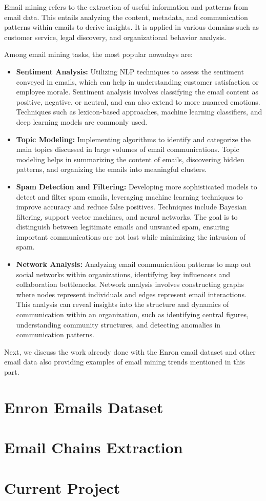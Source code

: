  Email mining refers to the extraction of useful information and patterns from email data.
 This entails analyzing the content, metadata, and communication patterns within emails to derive insights. It is applied in various domains such as customer service, legal discovery, and organizational behavior analysis.
 
 Among email mining tasks, the most popular nowadays are:

 \begin{itemize}
     \item  \textbf{Sentiment Analysis:} Utilizing NLP techniques to assess the sentiment conveyed in emails, which can help in understanding customer satisfaction or employee morale. Sentiment analysis involves classifying the email content as positive, negative, or neutral, and can also extend to more nuanced emotions. Techniques such as lexicon-based approaches,
 machine learning classifiers, and deep learning models are commonly used.
    \item \textbf{Topic Modeling:} Implementing algorithms to identify and categorize the main topics discussed in large volumes of email communications. Topic modeling helps in summarizing the content of emails, discovering hidden patterns, and organizing the emails into meaningful clusters.
    \item \textbf{Spam Detection and Filtering:} Developing more sophisticated models to detect and filter spam emails, leveraging machine learning techniques to improve accuracy and reduce false positives. Techniques include Bayesian filtering, support vector machines, and neural networks. The goal is to distinguish between legitimate emails and unwanted spam, ensuring important communications are not lost while minimizing the intrusion of spam.
    \item \textbf{Network Analysis:} Analyzing email communication patterns to map out social networks within organizations, identifying key influencers and collaboration bottlenecks.
 Network analysis involves constructing graphs where nodes represent individuals and edges represent email interactions. This analysis can reveal insights into the structure and dynamics of communication within an organization, such as identifying central figures, understanding community structures, and detecting anomalies in communication patterns.
 \end{itemize}
 
 Next, we discuss the work already done with the Enron email dataset and other email data also providing examples of email mining trends mentioned in this part.

\section{Enron Emails Dataset}
\label{sec:enron_emails_dataset}


\section{Email Chains Extraction}
\label{sec:email_chains_extraction}


\section{Current Project}
\label{sec:current_project}